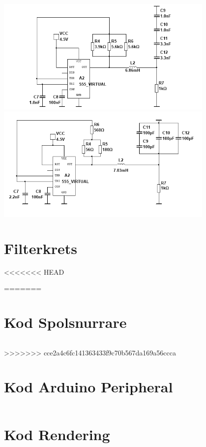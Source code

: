 \documentclass[a4paper]{article}
\begin{document}
\begin{sloppypar}
  \label{bilaga:Schema-Oscillatorkretsar}
  \includegraphics[width = 0.8\textwidth]{555-100kHz-circuit.png}
  \includegraphics[width = 0.8\textwidth]{555-117kHz-circuit.png}




  \section{Filterkrets}

  <<<<<<< HEAD

  =======
  \section{Kod Spolsnurrare}
  \label{bilaga:Kod_Spolsnurrare}
  \inputminted[breaklines]{cpp}{./Code/Spolsnurrare.cpp}
  >>>>>>> cce2a4c6fc141363433f9c70b567da169a56ccca

  \section{Kod Arduino Peripheral}
  \label{bilaga:Kod_Arduino_Peripheral}
  \inputminted[breaklines]{cpp}{./Code/peripheral.cpp}

  \section{Kod Rendering}
  \label{bilaga:Kod_Rendering}
  \inputminted[breaklines]{csharp}{./Code/handController.cs}
  \newpage
\end{sloppypar}
\end{document}
